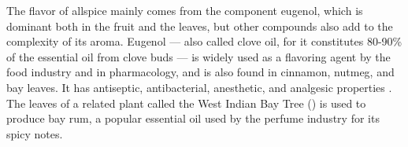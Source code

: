 The flavor of allspice mainly comes from the component eugenol, which is dominant both in the fruit and the leaves, but other compounds also add to the complexity of its aroma. Eugenol --- also called clove oil, for it constitutes 80-90\% of the essential oil from clove buds \autocite[166]{barnes_herbal_2007} --- is widely used as a flavoring agent by the food industry and in pharmacology, and is also found in cinnamon, nutmeg, and bay leaves. It has antiseptic, antibacterial, anesthetic, and analgesic properties \autocite{ulanowska_biological_2021}. The leaves of a related plant called the West Indian Bay Tree () is used to produce bay rum, a popular essential oil used by the perfume industry for its spicy notes. 







